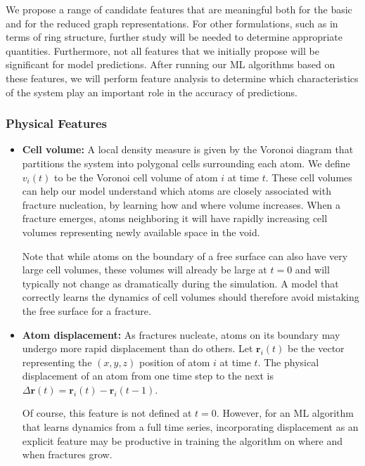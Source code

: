 We propose a range of candidate features that are meaningful both for the basic and for the reduced graph representations.  For other formulations, such as in terms of ring structure, further study will be needed to determine appropriate quantities.  Furthermore, not all features that we initially propose will be significant for model predictions.  After running our ML algorithms based on these features, we will perform feature analysis to determine which characteristics of the system play an important role in the accuracy of predictions.

\subsubsection{Physical Features}
\label{subsubsec: Physical Features}

\begin{itemize}
    
    \item \textbf{Cell volume:} A local density measure is given by the Voronoi diagram that partitions the system into polygonal cells surrounding each atom.  We define $v_i(t)$ to be the Voronoi cell volume of atom $i$ at time $t$.  These cell volumes can help our model understand which atoms are closely associated with fracture nucleation, by learning how and where volume increases.  When a fracture emerges, atoms neighboring it will have rapidly increasing cell volumes representing newly available space in the void.
    
    Note that while atoms on the boundary of a free surface can also have very large cell volumes, these volumes will already be large at $t=0$ and will typically not change as dramatically during the simulation.  A model that correctly learns the dynamics of cell volumes should therefore avoid mistaking the free surface for a fracture.

    \item \textbf{Atom displacement:} As fractures nucleate, atoms on its boundary may undergo more rapid displacement than do others.  Let $\mathbf{r}_i(t)$ be the vector representing the $(x,y,z)$ position of atom $i$ at time $t$. The physical displacement of an atom from one time step to the next is $\Delta \mathbf{r}(t)=\mathbf{r}_i(t)-\mathbf{r}_i(t-1)$.
    
    Of course, this feature is not defined at $t=0$.  However, for an ML algorithm that learns dynamics from a full time series, incorporating displacement as an explicit feature may be productive in training the algorithm on where and when fractures grow.


\end{itemize}
